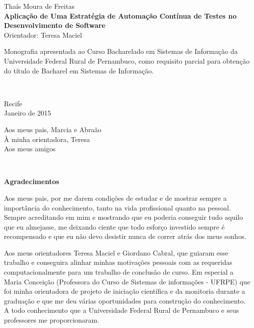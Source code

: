 %
\hyphenation{}

\vspace*{0.0cm}
{\center
{\Large Thaís Moura de Freitas}\\[2.4cm]
{\huge \bf Aplicação de Uma Estratégia de Automação Contínua de Testes no Desenvolvimento de Software}\\[2.0cm]
{\Large Orientador: Teresa Maciel}}\\[2.0cm]


{\raggedleft
\begin{minipage}[t]{8.3cm}
\setlength{\baselineskip}{0.25in}
Monografia apresentada ao Curso Bacharelado em Sistemas de Informação  da Universidade Federal Rural de Pernambuco, como requisito parcial para obtenção do título de Bacharel em Sistemas de Informação.\end{minipage}\\[2cm]}
\vspace{3cm}
{\center Recife \\[3mm]
Janeiro de 2015 \\}

\newpage
\vspace*{18cm}
{\raggedleft
\begin{minipage}[t]{6.0cm}
\setlength{\baselineskip}{0.25in}
Aos meus pais, Marcia e Abraão\\
À minha orientadora, Teresa\\
Aos meus amigos\\
\end{minipage}\\[2cm]}

\newpage
\begin{center}
{\Large \bf Agradecimentos}
\end{center}
\vspace*{-0.06in}

Aos meus pais, por me darem condições de estudar e de mostrar sempre a importância do conhecimento, tanto na vida profissional quanto na pessoal. Sempre acreditando em mim e mostrando que eu poderia conseguir tudo aquilo que eu almejasse, me deixando ciente que todo esforço investido sempre é recompensado e que eu não devo desistir nunca de correr atrás dos meus sonhos. 

Aos meus orientadores Teresa Maciel e Giordano Cabral, que guiaram esse trabalho e conseguira alinhar minhas motivações pessoais com as requeridas computacionalmente para um trabalho de conclusão de curso. Em especial a Maria Conceição (Professora do Curso de Sistemas de informações - UFRPE) que foi minha orientadora de projeto de iniciação científica e da monitoria durante a graduação e que me deu várias oportunidades para construção do conhecimento. A todo conhecimento que a Universidade Federal Rural de Pernambuco e seus professores me proporcionaram. 

